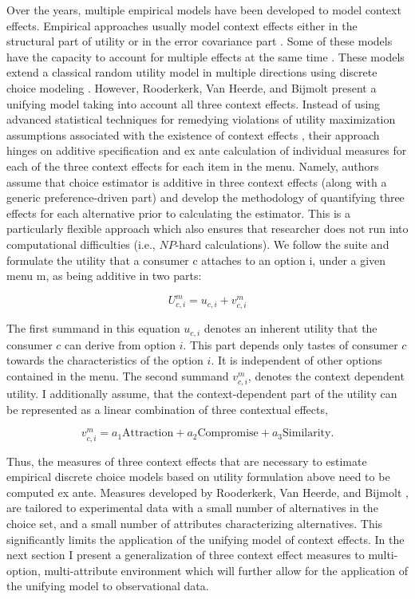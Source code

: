 \documentclass[a4paper,12pt]{article}
\newcommand{\citeyearonly}[1]{\citeyearpar{#1}}
\begin{document}
Over the years, multiple empirical models have been developed to model context effects. Empirical approaches usually model context effects either in the structural part of utility or in the error covariance part \citep{kamakuraSrivastava84, dotsonEtAl18}. Some of these models have the capacity to account for multiple effects at the same time \citep{tverskySimonson93, orhun09}. These models extend a classical random utility model \citep{mcfadden01} in multiple directions using discrete choice modeling \citep{benAkivaLerman85}. However, Rooderkerk, Van Heerde, and Bijmolt \citeyearonly{roodrkerkEtAl11} present a unifying model taking into account all three context effects. Instead of using advanced statistical techniques for remedying violations of utility maximization assumptions associated with the existence of context effects \citep{luce59}, their approach hinges on additive specification and ex ante calculation of individual measures for each of the three context effects for each item in the menu. Namely, authors assume that choice estimator is additive in three context effects (along with a generic preference-driven part) and develop the methodology of quantifying three effects for each alternative prior to calculating the estimator. This is a particularly flexible approach which also ensures that researcher does not run into computational difficulties (i.e., $NP$-hard calculations). We follow the suite and formulate the utility that a consumer c attaches to an option i, under a given menu m, as being additive in two parts:

$$U_{c,i}^m = u_{c,i} + v_{c,i}^m$$

The first summand in this equation $u_{c,i}$ denotes an inherent utility that the consumer $c$ can derive from option $i$. This part depends only tastes of consumer $c$ towards the characteristics of the option $i$. It is independent of other options contained in the menu. The second summand $v_{c,i}^m$, denotes the context dependent utility. I additionally assume, that the context-dependent part of the utility can be represented as a linear combination of three contextual effects, 

$$v_{c,i}^m = a_1 \text{Attraction} + a_2 \text{Compromise} + a_3 \text{Similarity}.
$$

Thus, the measures of three context effects that are necessary to estimate empirical discrete choice models based on utility formulation above need to be computed ex ante. Measures developed by Rooderkerk, Van Heerde, and Bijmolt \citeyearonly{roodrkerkEtAl11}, are tailored to experimental data with a small number of alternatives in the choice set, and a small number of attributes characterizing alternatives. This significantly limits the application of the unifying model of context effects. In the next section I present a generalization of three context effect measures to multi-option, multi-attribute environment which will further allow for the application of the unifying model to observational data.
\end{document}
